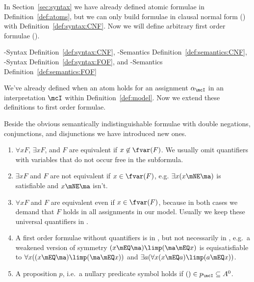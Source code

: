

In Section~\ref{sec:syntax} we have already defined atomic formulae in Definition~\ref{def:atoms},
but we can only build formulae in clausal normal form (\CNF) with Definition~\vref{def:syntax:CNF}.
Now we will define arbitrary first order formulae (\FOF).

\CNF-Syntax Definition~\vref{def:syntax:CNF},
\CNF-Semantics Definition~\vref{def:semantics:CNF},
\FOF-Syntax Definition~\vref{def:syntax:FOF}, and
\FOF-Semantics Definition~\vref{def:semantics:FOF}



We've already defined when an atom holds for an assignment \( \alpha_\mcI \)
in an interpretation \( \mcI \) within Definition~\vref{def:model}.
Now we extend these definitions to first order formulae.


%
	Beside the obvious semantically indistinguishable formulae with double negations, conjunctions, and disjunctions
	we have introduced new ones.
	\begin{enumerate}
		\item \( \forall x F \), \( \exists x F \), and \( F \) are equivalent if \( x\not\in\fvar(F) \).
		We usually omit quantifiers with variables that do not occur free in the subformula.
		\item \( \exists x F \) and \( F \) are not equivalent if \( x\in\fvar(F) \),
		e.g. \( \exists x(x\mNE\ma) \) is satisfiable and \( x\mNE\ma \) isn't.
		\item \( \forall x F \) and \( F \) are equivalent even if \( x\in\fvar(F) \),
		because in both cases we demand that \( F \) holds in all assignments in our model.
		Usually we keep these universal quantifiers in \FOF{}.

		\item A first order formulae without quantifiers is in ,
		but not necessarily in \CNF, e.g.~a weakened version of symmetry \( (x\mEQ \ma)\limp (\ma\mEQ x) \)
		is equisatisfiable to \( \forall x ((x\mEQ \ma)\limp (\ma\mEQ x)) \)
		and \( \exists a (\forall x (x\mEQ a)\limp (a\mEQ x)) \).
		\item A proposition \( p \), i.e.~a nullary predicate symbol holds if \( ()\in p_\mcI \subseteq A^0 \).
	\end{enumerate}